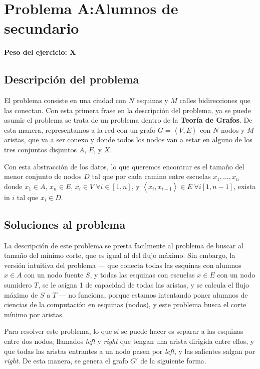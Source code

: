 \newcommand{\mleft}{\text{left}}
\newcommand{\mright}{\text{right}}
\newpage{}

\section{Problema A:\@ Alumnos de secundario}
\textbf{Peso del ejercicio: X}

\subsection{Descripción del problema}

El problema consiste en una ciudad con \(N\) esquinas y \(M\) calles bidirecciones que las conectan. Con esta primera frase en la descripción del problema, ya se puede asumir el problema se trata de un problema dentro de la \textbf{Teoría de Grafos}. De esta manera, representamos a la red con un grafo \(G = \left<V, E\right>\) con \(N\) nodos y \(M\) aristas, que va a ser conexo y donde todos los nodos van a estar en alguno de los tres conjuntos disjuntos \(A\), \(E\), y \(X\).

Con esta abstracción de los datos, lo que queremos encontrar es el tamaño del menor conjunto de nodos \(D\) tal que por cada camino entre escuelas \(x_1, \ldots, x_n\) donde \(x_1 \in A\), \(x_n \in E\), \(x_i \in V \; \forall i \in \left[1, n\right]\), y \(\left<x_i, x_{i + 1}\right> \in E \; \forall i \left[1, n - 1\right]\), exista in \(i\) tal que \(x_i \in D\).

\subsection{Soluciones al problema}

La descripción de este problema se presta facilmente al problema de buscar al tamaño del mínimo corte, que es igual al del flujo máximo\cite[\textit{theorem~26.6}]{cormen}. Sin embargo, la versión intuitiva del problema --- que conecta todas las esquinas con alumnos \(x \in A\) con un nodo fuente \(S\), y todas las esquinas con escuelas \(x \in E\) con un nodo sumidero \(T\), se le asigna 1 de capacidad de todas las aristas, y se calcula el flujo máximo de \(S\) a \(T\) --- no funciona, porque estamos intentando poner alumnos de ciencias de la computación en esquinas (nodos), y este problema busca el corte mínimo por aristas.

Para resolver este problema, lo que sí se puede hacer es separar a las esquinas entre dos nodos, llamados \textit{left} y \textit{right} que tengan una arista dirigida entre ellos, y que todas las aristas entrantes a un nodo pasen por \textit{left}, y las salientes salgan por \textit{right}. De esta manera, se genera el grafo \(G'\) de la siguiente forma.


